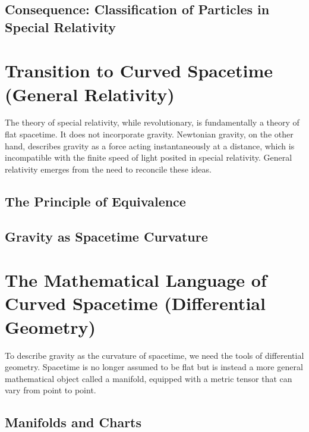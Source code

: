 \documentclass{amsart}
\theoremstyle{definition}
\theoremstyle{remark}
\begin{document}
\subsection{Consequence: Classification of Particles in Special Relativity}
\label{subsec:particle_classification_sr}


\section{Transition to Curved Spacetime (General Relativity)}
\label{sec:transition_gr}
The theory of special relativity, while revolutionary, is fundamentally a theory of flat spacetime.
It does not incorporate gravity.
Newtonian gravity, on the other hand, describes gravity as a force acting instantaneously at a distance, which is incompatible with the finite speed of light posited in special relativity.
General relativity emerges from the need to reconcile these ideas.

\subsection{The Principle of Equivalence}

\subsection{Gravity as Spacetime Curvature}

\section{The Mathematical Language of Curved Spacetime (Differential Geometry)}
\label{sec:math_gr}
To describe gravity as the curvature of spacetime, we need the tools of differential geometry.
Spacetime is no longer assumed to be flat but is instead a more general mathematical object called a manifold, equipped with a metric tensor that can vary from point to point.
\subsection{Manifolds and Charts}
\end{document}
